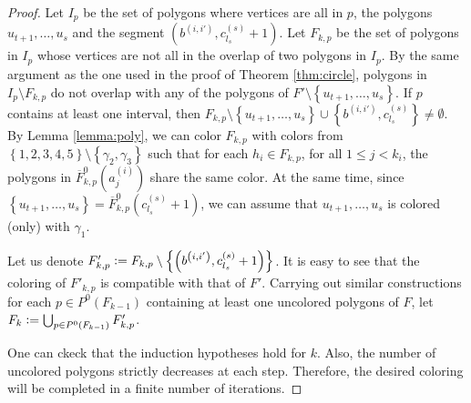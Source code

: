\documentclass[12pt]{article}
\theoremstyle{definition}
\newcommand{\defeq}{\vcentcolon=}
\begin{document}
\begin{proof}
         Let $I_{p}$ be the set of polygons
         where vertices are all
         in $p$, the polygons
         $u_{t+1}, \ldots, u_{s}$ and 
         the segment $\left(b^{\left(i, i'\right)},
         c_{l_{s}}^{\left(s\right)} + 1\right)$.
         Let $F_{k, p}$ be the set of
         polygons in $I_{p}$ whose 
         vertices are not all in
         the overlap of two polygons
         in $I_{p}$.
         By the same argument as the
         one used in the proof of 
         Theorem \ref{thm:circle},
         polygons in $I_{p} \setminus F_{k, p}$ 
         do not overlap with 
         any of the polygons of
         $F' \setminus \left\{u_{t+1}, \ldots
         , u_{s}\right\}$.
         If $p$ contains at least
         one interval, 
         then 
         $F_{k, p} \setminus 
         \left\{u_{t + 1}, \ldots,
         u_{s}\right\} \cup 
         \left\{b^{\left(i, i'\right)}, 
         c_{l_{s}}^{\left(s\right)}\right\}
         \neq \emptyset$.
         By Lemma \ref{lemma:poly},
         we can color $F_{k, p}$ with
         colors from 
         $\left\{1, 2, 3, 4, 5\right\} \setminus 
         \left\{\gamma_2, \gamma_3\right\}$
         such that for each $h_{i} \in F_{k, p}$,
         for all
         $1 \leq j < k_{i}$, the polygons in
         $\overline{F}_{k, p}^{0}\left(a_{j}^{\left(i\right)}\right)$ 
         share the same color. At the same time,
         since $\left\{u_{t +1}, \ldots, u_{s}\right\} = 
         \overline{F}_{k, p}^{0}\left(c_{l_{s}}^{\left(s\right)} + 1\right)$,
         we can assume that $u_{t + 1}, \ldots, u_{s}$ 
         is colored (only) with $\gamma_1$.

         Let us denote $F'_{k, p} \defeq
         F_{k, p} \setminus \left\{\left(
         b^{\left(i, i'\right)},
         c_{l_{s}}^{\left(s\right)} + 1\right)\right\}$.
         It is easy to see that the coloring of
         $F'_{k, p}$ is compatible with that 
         of $F'$. Carrying out similar 
         constructions for each 
         $p \in P^{0}\left(F_{k-1}\right)$ 
         containing at least one uncolored
         polygons of $F$, let 
         $F_{k} \defeq \bigcup_{p \in P^{0}\left(F_{k -1}\right)}
         F'_{k, p}$.

         One can ckeck that the induction
         hypotheses hold for $k$.
         Also, the number of uncolored polygons
         strictly decreases at each step.
         Therefore, the desired coloring will be completed
         in a finite number of iterations.
     \end{proof}    
\end{document}
